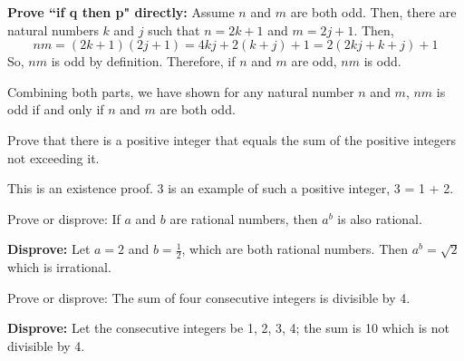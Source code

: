 \begin{questions}
\begin{solution}
    \smallskip
    \textbf{Prove ``if q then p" directly:} Assume $n$ and $m$ are
    both odd.  Then, there are natural numbers $k$ and $j$ such
    that $n = 2k+1$ and $m=2j+1$.  Then,
    \[ nm = (2k+1)(2j+1) = 4kj + 2(k+j) +1 = 2(2kj +k + j) +1 \]
    So, $nm$ is odd by definition. Therefore, if $n$ and $m$ are
    odd, $nm$ is odd.

    \smallskip
    Combining both parts, we have shown for any natural number $n$ and $m$, $nm$ is odd if and only if $n$ and $m$ are both odd.
\end{solution}



 Prove that there is a positive integer that equals the
sum of the positive integers not exceeding it.
    \ifprintanswers
        \vspace{-10pt}
    \fi
\begin{solution}
    This is an existence proof.  3 is an example of such a positive
    integer, 3 = 1 + 2.
\end{solution}


 Prove or disprove: If $a$ and $b$ are rational
numbers, then $a^b$ is also rational.
    \ifprintanswers
        \vspace{-10pt}
    \fi
\begin{solution}
    \textbf{Disprove:} Let $a=2$ and $b=\frac{1}{2}$, which are both rational numbers.  Then $a^b =
    \sqrt{2}$ which is irrational.
\end{solution}


 Prove or disprove: The sum of four consecutive integers is divisible by 4.
    \ifprintanswers
        \vspace{-10pt}
    \fi
\begin{solution}
    \textbf{Disprove:} Let the consecutive integers be 1, 2, 3, 4; the sum is 10 which is not divisible by 4.
\end{solution}




\end{questions}
